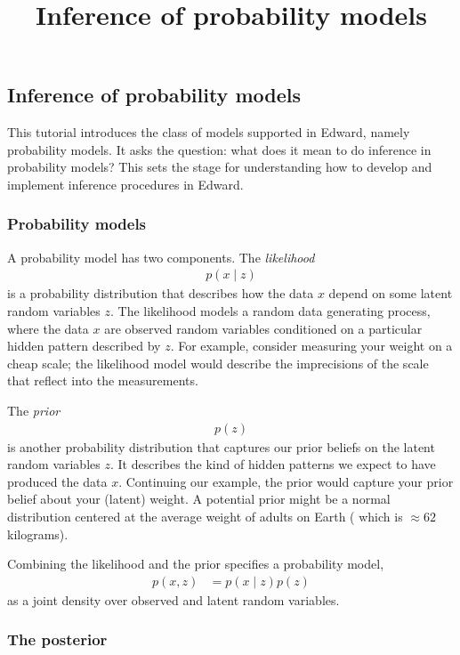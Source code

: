 \title{Inference of probability models}

\subsection{Inference of probability models}

This tutorial introduces the class of models supported in Edward, namely
probability models. It asks the question: what does it mean to do
inference in probability models? This sets the stage for
understanding how to develop and implement inference procedures in Edward.

\subsubsection{Probability models}

A probability model has two components. The \emph{likelihood}
\begin{align*}
  p(x \mid z)
\end{align*}
is a probability distribution that describes how the data $x$ depend on some
latent random variables $z$. The likelihood models a random data generating
process, where the data $x$ are observed random variables conditioned on a
particular hidden pattern described by $z$. For example, consider measuring your
weight on a cheap scale; the likelihood model would describe the imprecisions
of the scale that reflect into the measurements.

The \emph{prior}
\begin{align*}
  p(z)
\end{align*}
is another probability distribution that captures our prior beliefs on
the latent random variables $z$. It describes the kind of hidden patterns we
expect to have produced the data $x$. Continuing our example, the prior would
capture your prior belief about your (latent) weight. A potential prior might be
a normal distribution centered at the average weight of adults on Earth (
which is $\approx62$ kilograms).

Combining the likelihood and the prior specifies a probability model,
\begin{align*}
  p(x,z)
  &=
  p(x \mid z)
  p(z)
\end{align*}
as a joint density over observed and latent random variables. 

\subsubsection{The posterior}


